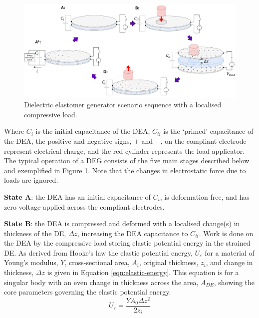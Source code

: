 \begin{figure}[H]
	\centering
	\includegraphics[width = 1.05\textwidth]{Figures/DEA-EIT-DEG_sequence_v2.png}
	\vspace{0.2cm}
	\caption{Dielectric elastomer generator scenario sequence with a localised compressive load.}
	\label{fig:dea_eit_deg}
\end{figure}
Where $C_i$ is the initial capacitance of the DEA, $C_{ii}$ is the `primed' capacitance of the DEA, the positive and negative signs, $+$ and $-$, on the compliant electrode represent electrical charge, and the red cylinder represents the load applicator. The typical operation of a DEG consists of the five main stages described below and exemplified in Figure \ref{fig:dea_eit_deg}. Note that the changes in electrostatic force due to loads are ignored.

\textbf{State A}: the DEA has an initial capacitance of $C_i$, is deformation free, and has zero voltage applied across the compliant electrodes.

\textbf{State B}: the DEA is compressed and deformed with a localised change(s) in thickness of the DE, $\Delta z$, increasing the DEA capacitance to $C_{ii}$. Work is done on the DEA by the compressive load storing elastic potential energy in the strained DE.
As derived from Hooke's law the elastic potential energy, $U_{\varepsilon}$ for a material of Young's modulus, $Y$, cross-sectional area, $A_i$, original thickness, $z_i$, and change in thickness, $\Delta z$ is given in Equation \ref{eqn:elastic-energy}. This equation is for a singular body with an even change in thickness across the area, $A_{DE}$, showing the core parameters governing the elastic potential energy.
\begin{equation}
	U_{\varepsilon} = \frac{YA_0\Delta z^2}{2z_i}
	\label{eqn:elastic-energy}
\end{equation}

